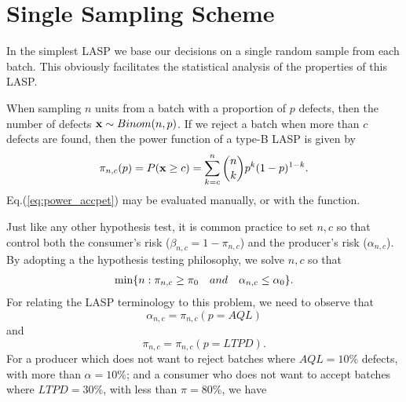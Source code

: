 \section{Single Sampling Scheme}
In the simplest LASP we base our decisions on a single random sample from each batch.
This obviously facilitates the statistical analysis of the properties of this LASP.

When sampling $n$ units from a batch with a proportion of $p$ defects, then the number of defects $\mathbf{x} \sim Binom(n,p)$.
If we reject a batch when more than $c$ defects are found, then the power function of a type-B LASP is given by
\begin{align}
\label{eq:power_accpet}
	\pi_{n,c}(p)=P(\mathbf{x} \geq c)= \sum_{k=c}^n \binom{n}{k} p^k (1-p)^{1-k} .
\end{align}
Eq.(\ref{eq:power_accpet}) may be evaluated manually, or with the  \R function. 

Just like any other hypothesis test, it is common practice to set $n,c$ so that control both the consumer's risk ($\beta_{n,c}=1-\pi_{n,c}$) and the producer's risk ($\alpha_{n,c}$).
By adopting a the hypothesis testing philosophy, we solve $n,c$ so that 
\begin{align}
 \min \{ n : \pi_{n,c}\geq \pi_0 \quad and \quad \alpha_{n,c}\leq \alpha_0  \}.
\end{align}
For relating the LASP terminology to this problem, we need to observe that $$\alpha_{n,c}=\pi_{n,c}(p=AQL)$$ and $$\pi_{n,c}=\pi_{n,c}(p=LTPD).$$
For a producer which does not want to reject batches where $AQL=10\%$ defects, with more than $\alpha=10\%$; 
and a consumer who does not want to accept batches where $LTPD=30\%$, with less than $\pi=80\%$, 
we have 

